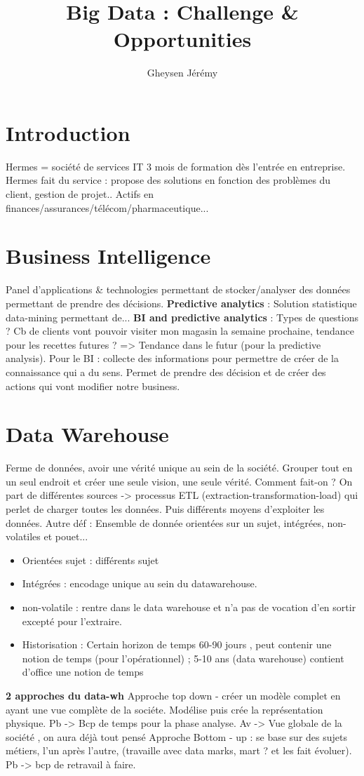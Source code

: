 \documentclass[10pt,a4paper]{article}
\author{Gheysen Jérémy}
\title{Big Data : Challenge \& Opportunities}
\begin{document}
\maketitle
\newpage
\section{Introduction}
Hermes = société de services IT
3 mois de formation dès l'entrée en entreprise. 
Hermes fait du service : propose des solutions en fonction des problèmes du client, gestion de projet..
Actifs en finances/assurances/télécom/pharmaceutique...
\section{Business Intelligence}
Panel d'applications \& technologies permettant de stocker/analyser des données permettant de prendre des décisions. 
\textbf{Predictive analytics} : Solution statistique data-mining permettant de...
\textbf{BI and predictive analytics} : Types de questions ? Cb de clients vont pouvoir visiter mon magasin la semaine prochaine, tendance pour les recettes futures ? => Tendance dans le futur (pour la predictive analysis).
Pour le BI : collecte des  informations pour permettre de créer de la connaissance qui a du sens. Permet de prendre des décision et de créer des actions qui vont modifier notre business.
\section{Data Warehouse}
Ferme de données, avoir une vérité unique au sein de la société. Grouper tout en un seul endroit et créer une seule vision, une seule vérité.
Comment fait-on ? 
On part de différentes sources -> processus ETL (extraction-transformation-load) qui perlet de charger toutes les données. 
Puis différents moyens d'exploiter les données. 
Autre déf : Ensemble de donnée orientées sur un sujet, intégrées, non-volatiles et pouet...
\begin{itemize}
\item Orientées sujet : différents sujet
\item Intégrées : encodage unique au sein du datawarehouse.
\item non-volatile : rentre dans le data warehouse et n'a pas de vocation d'en sortir excepté pour l'extraire.
\item Historisation : Certain horizon de temps 60-90 jours , peut contenir une notion de temps (pour l'opérationnel) ;  5-10 ans (data warehouse) contient d'office une notion de temps
\end{itemize}
\textbf{2 approches du data-wh}
Approche top down - créer un modèle complet en ayant une vue complète de la sociéte. Modélise puis crée la représentation physique. Pb -> Bcp de temps pour la phase analyse. Av -> Vue globale de la société , on aura déjà tout pensé
Approche Bottom - up : se base sur des sujets métiers, l'un après l'autre, (travaille avec data marks, mart ?  et les fait évoluer). Pb -> bcp de retravail à faire. 
\end{document}

